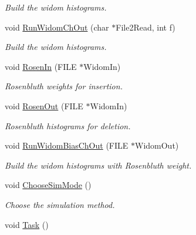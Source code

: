 \begin{DoxyCompactItemize}
\begin{DoxyCompactList}\small\item\em \-Build the widom histograms. \end{DoxyCompactList}\item 
\hypertarget{classForces_a6c88528ae5cf46ad5cc7080ca47ef1fb}{void \hyperlink{classForces_a6c88528ae5cf46ad5cc7080ca47ef1fb}{\-Run\-Widom\-Ch\-Out} (char $\ast$\-File2\-Read, int f)}\label{classForces_a6c88528ae5cf46ad5cc7080ca47ef1fb}

\begin{DoxyCompactList}\small\item\em \-Build the widom histograms. \end{DoxyCompactList}\item 
\hypertarget{classForces_a3f16bbc64bdd8ac4835e6a4702e30678}{void \hyperlink{classForces_a3f16bbc64bdd8ac4835e6a4702e30678}{\-Rosen\-In} (\-F\-I\-L\-E $\ast$\-Widom\-In)}\label{classForces_a3f16bbc64bdd8ac4835e6a4702e30678}

\begin{DoxyCompactList}\small\item\em \-Rosenbluth weights for insertion. \end{DoxyCompactList}\item 
\hypertarget{classForces_a7a1566050eaabfebba82e0b6002d797b}{void \hyperlink{classForces_a7a1566050eaabfebba82e0b6002d797b}{\-Rosen\-Out} (\-F\-I\-L\-E $\ast$\-Widom\-In)}\label{classForces_a7a1566050eaabfebba82e0b6002d797b}

\begin{DoxyCompactList}\small\item\em \-Rosenbluth histograms for deletion. \end{DoxyCompactList}\item 
\hypertarget{classForces_a395a965e8373d10dc626ea945f161168}{void \hyperlink{classForces_a395a965e8373d10dc626ea945f161168}{\-Run\-Widom\-Bias\-Ch\-Out} (\-F\-I\-L\-E $\ast$\-Widom\-Out)}\label{classForces_a395a965e8373d10dc626ea945f161168}

\begin{DoxyCompactList}\small\item\em \-Build the widom histograms with \-Rosenbluth weight. \end{DoxyCompactList}\item 
void \hyperlink{classForces_a111835c2cd5d392591f9e32ea6d9cf19}{\-Choose\-Sim\-Mode} ()
\begin{DoxyCompactList}\small\item\em \-Choose the simulation method. \end{DoxyCompactList}\item 
\hypertarget{classForces_af662b8c150e7cdd3983066e8dab609be}{void \hyperlink{classForces_af662b8c150e7cdd3983066e8dab609be}{\-Task} ()}\label{classForces_af662b8c150e7cdd3983066e8dab609be}


\end{DoxyCompactItemize}
